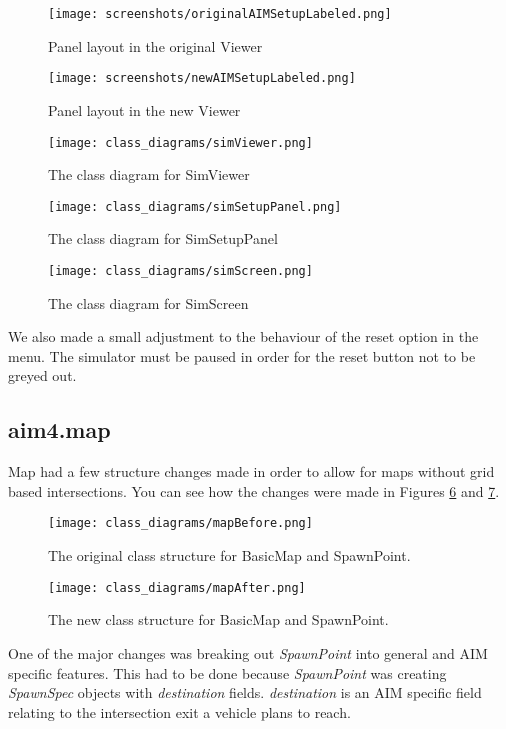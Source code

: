 \begin{figure}[htb]
\texttt{[image: screenshots/originalAIMSetupLabeled.png]}
\caption{Panel layout in the original Viewer}
\label{fig:originalAIMSetupLabeled}
\end{figure}

\begin{figure}[htb]
\texttt{[image: screenshots/newAIMSetupLabeled.png]}
\caption{Panel layout in the new Viewer}
\label{fig:newAIMSetupLabeled}
\end{figure}

\begin{figure}[htb]
\texttt{[image: class\_diagrams/simViewer.png]}
\caption{The class diagram for SimViewer}
\label{fig:simViewer}
\end{figure}

\begin{figure}[htb]
\texttt{[image: class\_diagrams/simSetupPanel.png]}
\caption{The class diagram for SimSetupPanel}
\label{fig:simSetupPanel}
\end{figure}

\begin{figure}[htb]
\texttt{[image: class\_diagrams/simScreen.png]}
\caption{The class diagram for SimScreen}
\label{fig:simScreen}
\end{figure}

We also made a small adjustment to the behaviour of the reset option in the menu. The simulator must be paused in order for the reset button not to be greyed out.

\subsection{aim4.map}
\label{subsec:aim4.map}
Map had a few structure changes made in order to allow for maps without grid based intersections. You can see how the changes were made in Figures \ref{fig:mapBefore} and \ref{fig:mapAfter}. 

\begin{figure}[htb]
\texttt{[image: class\_diagrams/mapBefore.png]}
\caption{The original class structure for BasicMap and SpawnPoint.}
\label{fig:mapBefore}
\end{figure}

\begin{figure}[htb]
\texttt{[image: class\_diagrams/mapAfter.png]}
\caption{The new class structure for BasicMap and SpawnPoint.}
\label{fig:mapAfter}
\end{figure}

One of the major changes was breaking out \emph{SpawnPoint} into general and AIM specific features. This had to be done because \emph{SpawnPoint} was creating \emph{SpawnSpec} objects with \emph{destination} fields. \emph{destination} is an AIM specific field relating to the intersection exit a vehicle plans to reach.

